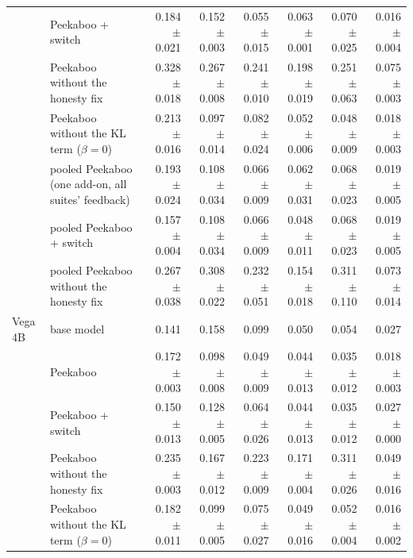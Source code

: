 \begin{table}[tbp]
{\begin{tabular}{llrrrrrr}
 & Peekaboo + switch & 0.184 {\scriptsize$\pm$0.021} & 0.152 {\scriptsize$\pm$0.003} & 0.055 {\scriptsize$\pm$0.015} & 0.063 {\scriptsize$\pm$0.001} & 0.070 {\scriptsize$\pm$0.025} & 0.016 {\scriptsize$\pm$0.004} \\
 & Peekaboo without the honesty fix & 0.328 {\scriptsize$\pm$0.018} & 0.267 {\scriptsize$\pm$0.008} & 0.241 {\scriptsize$\pm$0.010} & 0.198 {\scriptsize$\pm$0.019} & 0.251 {\scriptsize$\pm$0.063} & 0.075 {\scriptsize$\pm$0.003} \\
 & Peekaboo without the KL term ($\beta = 0$) & 0.213 {\scriptsize$\pm$0.016} & 0.097 {\scriptsize$\pm$0.014} & 0.082 {\scriptsize$\pm$0.024} & 0.052 {\scriptsize$\pm$0.006} & 0.048 {\scriptsize$\pm$0.009} & 0.018 {\scriptsize$\pm$0.003} \\
 & pooled Peekaboo (one add-on, all suites' feedback) & 0.193 {\scriptsize$\pm$0.024} & 0.108 {\scriptsize$\pm$0.034} & 0.066 {\scriptsize$\pm$0.009} & 0.062 {\scriptsize$\pm$0.031} & 0.068 {\scriptsize$\pm$0.023} & 0.019 {\scriptsize$\pm$0.005} \\
 & pooled Peekaboo + switch & 0.157 {\scriptsize$\pm$0.004} & 0.108 {\scriptsize$\pm$0.034} & 0.066 {\scriptsize$\pm$0.009} & 0.048 {\scriptsize$\pm$0.011} & 0.068 {\scriptsize$\pm$0.023} & 0.019 {\scriptsize$\pm$0.005} \\
 & pooled Peekaboo without the honesty fix & 0.267 {\scriptsize$\pm$0.038} & 0.308 {\scriptsize$\pm$0.022} & 0.232 {\scriptsize$\pm$0.051} & 0.154 {\scriptsize$\pm$0.018} & 0.311 {\scriptsize$\pm$0.110} & 0.073 {\scriptsize$\pm$0.014} \\
Vega 4B & base model & 0.141 & 0.158 & 0.099 & 0.050 & 0.054 & 0.027 \\
 & Peekaboo & 0.172 {\scriptsize$\pm$0.003} & 0.098 {\scriptsize$\pm$0.008} & 0.049 {\scriptsize$\pm$0.009} & 0.044 {\scriptsize$\pm$0.013} & 0.035 {\scriptsize$\pm$0.012} & 0.018 {\scriptsize$\pm$0.003} \\
 & Peekaboo + switch & 0.150 {\scriptsize$\pm$0.013} & 0.128 {\scriptsize$\pm$0.005} & 0.064 {\scriptsize$\pm$0.026} & 0.044 {\scriptsize$\pm$0.013} & 0.035 {\scriptsize$\pm$0.012} & 0.027 {\scriptsize$\pm$0.000} \\
 & Peekaboo without the honesty fix & 0.235 {\scriptsize$\pm$0.003} & 0.167 {\scriptsize$\pm$0.012} & 0.223 {\scriptsize$\pm$0.009} & 0.171 {\scriptsize$\pm$0.004} & 0.311 {\scriptsize$\pm$0.026} & 0.049 {\scriptsize$\pm$0.016} \\
 & Peekaboo without the KL term ($\beta = 0$) & 0.182 {\scriptsize$\pm$0.011} & 0.099 {\scriptsize$\pm$0.005} & 0.075 {\scriptsize$\pm$0.027} & 0.049 {\scriptsize$\pm$0.016} & 0.052 {\scriptsize$\pm$0.004} & 0.016 {\scriptsize$\pm$0.002} \\

\end{tabular}}
\end{table}
